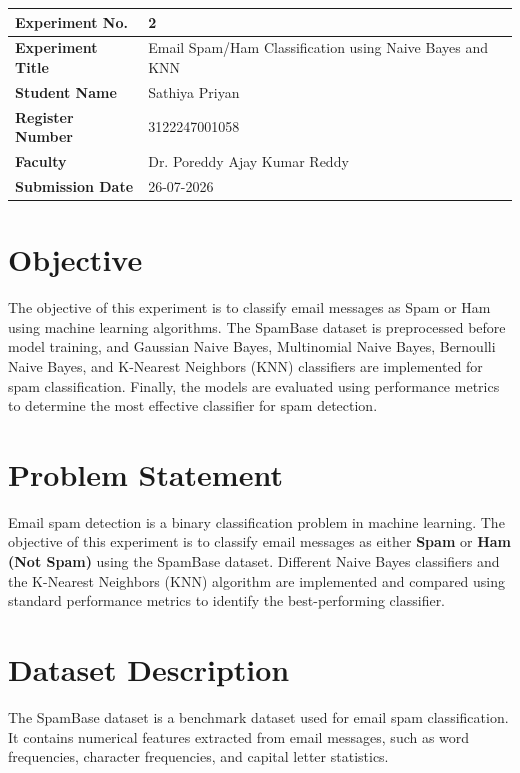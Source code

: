 \documentclass{article}
\begin{document}

\begin{table}[H] 
\centering 
\renewcommand{\arraystretch}{1.3} 
\begin{tabularx}{\textwidth}{|p{4cm}|X|} 
\hline 
\textbf{Experiment No.} & 2 \\ \hline 
\textbf{Experiment Title} & Email Spam/Ham Classification using Naive Bayes and
KNN \\ \hline 
\textbf{Student Name} & Sathiya Priyan \\ \hline 
\textbf{Register Number} & 3122247001058 \\ \hline 
\textbf{Faculty} & Dr. Poreddy Ajay Kumar Reddy \\ \hline 
\textbf{Submission Date} & 26-07-2026 \\ \hline 
\end{tabularx} 
\end{table} 

\section{Objective}

The objective of this experiment is to classify email messages as Spam or Ham using machine learning algorithms. The SpamBase dataset is preprocessed before model training, and Gaussian Naive Bayes, Multinomial Naive Bayes, Bernoulli Naive Bayes, and K-Nearest Neighbors (KNN) classifiers are implemented for spam classification. Finally, the models are evaluated using performance metrics to determine the most effective classifier for spam detection.

\section{Problem Statement} 
Email spam detection is a binary classification problem in machine learning. The objective of this experiment is to classify email messages as either \textbf{Spam} or \textbf{Ham (Not Spam)} using the SpamBase dataset. Different Naive Bayes classifiers and the K-Nearest Neighbors (KNN) algorithm are implemented and compared using standard performance metrics to identify the best-performing classifier. 

\section{Dataset Description} 
The SpamBase dataset is a benchmark dataset used for email spam classification. It contains numerical features extracted from email messages, such as word frequencies, character frequencies, and capital letter statistics. 
\end{document}
